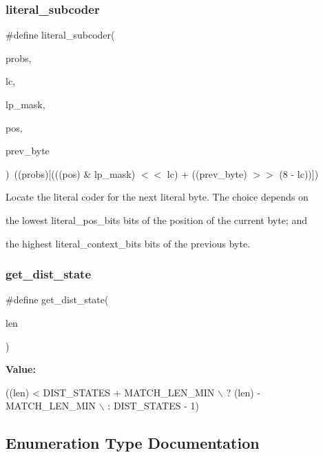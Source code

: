 \subsubsection{literal\+\_\+subcoder}
{\footnotesize\ttfamily \#define literal\+\_\+subcoder(\begin{DoxyParamCaption}\item[{}]{probs,  }\item[{}]{lc,  }\item[{}]{lp\+\_\+mask,  }\item[{}]{pos,  }\item[{}]{prev\+\_\+byte }\end{DoxyParamCaption})~((probs)[(((pos) \& lp\+\_\+mask) $<$$<$ lc) + ((prev\+\_\+byte) $>$$>$ (8 -\/ lc))])}

Locate the literal coder for the next literal byte. The choice depends on
\begin{DoxyItemize}
\item the lowest literal\+\_\+pos\+\_\+bits bits of the position of the current byte; and
\item the highest literal\+\_\+context\+\_\+bits bits of the previous byte. 
\end{DoxyItemize}\mbox{\label{lzma__common_8h_a704ef120888c4b6b3b7603577036600b}} 
\subsubsection{get\+\_\+dist\+\_\+state}
{\footnotesize\ttfamily \#define get\+\_\+dist\+\_\+state(\begin{DoxyParamCaption}\item[{}]{len }\end{DoxyParamCaption})}

{\bfseries Value\+:}
\begin{DoxyCode}
((len) < DIST\_STATES + MATCH\_LEN\_MIN \(\backslash\)
                ? (len) - MATCH\_LEN\_MIN \(\backslash\)
                : DIST\_STATES - 1)
\end{DoxyCode}


\subsection{Enumeration Type Documentation}
\mbox{\label{lzma__common_8h_a0898e5dfe84ee35425db2d9f6fbfa3d2}} 
